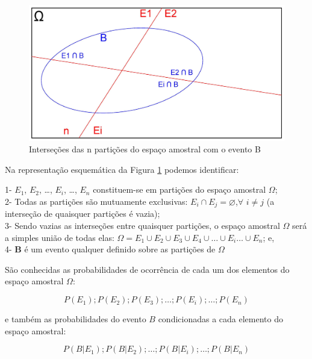 \documentclass[
]{book}
\begin{document}
\begin{figure}

{\centering \includegraphics[width=0.8\linewidth]{images4/bayes_5} 

}

\caption{Interseções das n partições do espaço amostral com o evento B}\label{fig:fig10}
\end{figure}

\hfill\break

Na representação esquemática da Figura \ref{fig:fig10} podemos identificar:

1- \(E_{1}\), \(E_{2}\), \dots , \(E_{i}\), \dots, \(E_{n}\) constituem-se em partições do espaço amostral \(\Omega\);\\
2- Todas as partições são mutuamente exclusivas: \(E_{i} \cap E_{j} = \varnothing\),\(\forall\) \(i \neq j\) (a interseção de quaisquer partições é vazia);\\
3- Sendo vazias as interseções entre quaisquer partições, o espaço amostral \(\Omega\) será a simples união de todas elas: \(\Omega = E_{1} \cup E_{2} \cup E_{3} \cup E_{4}\cup \dots \cup E_{i} \dots \cup E_{n}\); e,\\
4- \textbf{B} é um evento qualquer definido sobre as partições de \(\Omega\)

\hfill\break

São conhecidas as probabilidades de ocorrência de cada um dos elementos do espaço amostral \(\Omega\):

\hfill\break

\[
P(E_{1}); P(E_{2}); P(E_{3}); \dots;P(E_{i}); \dots; P(E_{n})
\]

\hfill\break

e também as probabilidades do evento \(B\) condicionadas a cada elemento do espaço amostral:

\hfill\break

\[
P(B|E_{1}); P(B|E_{2});\dots;P(B|E_{i});\dots; P(B|E_{n})
\]
\end{document}
